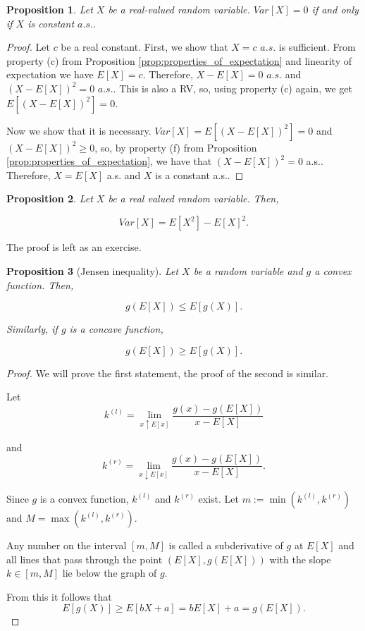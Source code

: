 \documentclass{book}
\theoremstyle{plain}%
\newtheorem{proposition}{Proposition}[section]
\theoremstyle{definition}
\newlength{\arrow}
\begin{document}
\begin{proposition}
Let $X$ be a real-valued random variable. $Var[X] = 0$ if and only if $X$ is constant $a.s.$.
\end{proposition}

\begin{proof}
Let $c$ be a real constant. First, we show that $X = c$ $a.s.$ is sufficient. From property (c) from Proposition \ref{prop:properties_of_expectation} and linearity of expectation we have $E[X] = c$. Therefore, $X - E[X] = 0$ $a.s.$ and $(X - E[X])^2 = 0$ $a.s.$. This is also a RV, so, using property (c) again, we get $E[(X - E[X])^2] = 0$.

Now we show that it is necessary. $Var[X] = E[(X - E[X])^2] = 0$ and $(X - E[X])^2 \geq 0$, so, by property (f) from Proposition \ref{prop:properties_of_expectation}, we have that $(X - E[X])^2 = 0$ a.s.. Therefore, $X = E[X]$ a.s. and $X$ is a constant a.s..
\end{proof}

\begin{proposition}
Let $X$ be a real valued random variable. Then,

$$Var[X] = E[X^2] - E[X]^2.$$\label{prop:variance}
\end{proposition}

The proof is left as an exercise.

\begin{proposition}[Jensen inequality]
Let $X$ be a random variable and $g$ a convex function. Then,

$$g(E[X]) \leq E[g(X)].$$

Similarly, if $g$ is a concave function,

$$g(E[X]) \geq E[g(X)].$$

\end{proposition}

\begin{proof}
We will prove the first statement, the proof of the second is similar.

Let $$k^{(l)}=\displaystyle\lim_{x\uparrow E[x]} \frac{g(x)-g(E[X])}{x-E[X]}$$

    and 
        $$k^{(r)}=\displaystyle\lim_{x\downarrow E[x]}
        \frac{g(x)-g(E[X])}{x-E[X]}.$$
        
Since $g$ is a convex function, $k^{(l)}$ and $k^{(r)}$ exist.
    Let $m:=\min(k^{(l)},k^{(r)})$ and $M=\max(k^{(l)},k^{(r)})$.

Any number on the interval $[m,M]$ is called a subderivative of $g$ at $E[X]$ and all lines that pass through the point $(E[X],g(E[X]))$ with the slope $k\in [m,M]$ lie below the graph of $g$.

From this it follows that
$$E[g(X)] \geq E[bX + a] = bE[X] + a = g(E[X]).$$
\end{proof}
\end{document}

